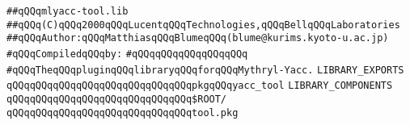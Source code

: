 \label{src/app/makelib/tools/mlyacc/mlyacc-tool.lib}
\verb|##qQQqmlyacc-tool.lib|\newline
\verb|##qQQq(C)qQQq2000qQQqLucentqQQqTechnologies,qQQqBellqQQqLaboratories|\newline
\verb|##qQQqAuthor:qQQqMatthiasqQQqBlumeqQQq(blume@kurims.kyoto-u.ac.jp)|\newline
\newline
\verb|#qQQqCompiledqQQqby:|\newline
\verb|#qQQqqQQqqQQqqQQqqQQq|\newline
\newline
\newline
\newline
\verb|#qQQqTheqQQqpluginqQQqlibraryqQQqforqQQqMythryl-Yacc.|\newline
\newline
\newline
\newline
\newline
\verb|LIBRARY_EXPORTS|\newline
\newline
\verb|qQQqqQQqqQQqqQQqqQQqqQQqqQQqqQQqpkgqQQqyacc_tool|\newline
\newline
\newline
\newline
\verb|LIBRARY_COMPONENTS|\newline
\newline
\verb|qQQqqQQqqQQqqQQqqQQqqQQqqQQqqQQq$ROOT/|\newline
\verb|qQQqqQQqqQQqqQQqqQQqqQQqqQQqqQQqtool.pkg|\newline

